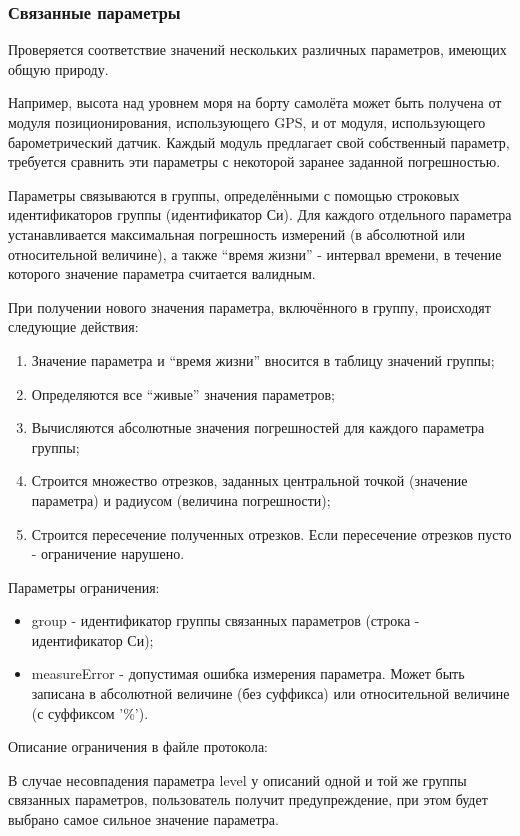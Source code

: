 


\subsubsection{Связанные параметры}

Проверяется соответствие значений нескольких различных параметров, имеющих 
общую природу.

Например, высота над уровнем моря на борту самолёта может быть получена от 
модуля позиционирования, использующего GPS, и от модуля, использующего 
барометрический датчик. Каждый модуль предлагает свой собственный параметр, 
требуется сравнить эти параметры с некоторой заранее заданной погрешностью.

Параметры связываются в группы, определёнными с помощью 
строковых идентификаторов группы (идентификатор Си). Для каждого отдельного 
параметра устанавливается максимальная погрешность измерений (в абсолютной или 
относительной величине), а также ``время жизни'' - интервал времени, в течение 
которого значение параметра считается валидным.

При получении нового значения параметра, включённого в группу, происходят 
следующие действия:

\begin{enumerate}
 \item Значение параметра и ``время жизни'' вносится в таблицу значений группы;
 \item Определяются все ``живые'' значения параметров;
 \item Вычисляются абсолютные значения погрешностей для каждого параметра 
группы;
 \item Строится множество отрезков, заданных центральной точкой (значение 
параметра) и радиусом (величина погрешности);
 \item Строится пересечение полученных отрезков. Если пересечение отрезков 
пусто - ограничение нарушено.
\end{enumerate}

Параметры ограничения:
\begin{itemize}
 \item group - идентификатор группы связанных параметров (строка - 
идентификатор Си);
 \item measureError - допустимая ошибка измерения параметра. Может быть 
записана в абсолютной величине (без суффикса) или относительной величине (с 
суффиксом '\%').
\end{itemize}

Описание ограничения в файле протокола:



В случае несовпадения параметра level у описаний одной и той же 
группы связанных параметров, пользователь получит предупреждение, при этом 
будет выбрано самое сильное значение параметра.
